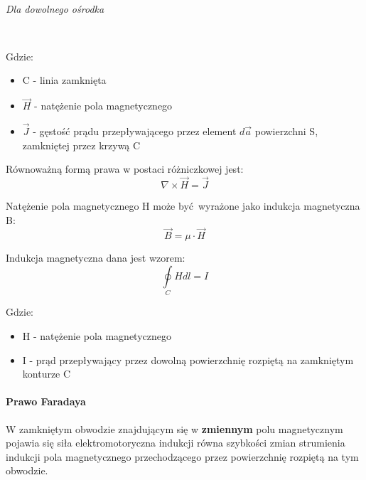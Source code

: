\documentclass{article}
\begin{document}
            \
            
            \textit{Dla dowolnego ośrodka}

            \
            
            Gdzie:
            \begin{itemize}
                \item C - linia zamknięta
                \item $\vec{H}$ - natężenie pola magnetycznego
                \item $\vec{J}$ - gęstość prądu przepływającego przez element
                $d\vec{a}$ powierzchni S, zamkniętej przez krzywą C
            \end{itemize}

            Równoważną formą prawa w postaci różniczkowej jest:
            \begin{equation}
                \nabla \times \vec{H} = \vec{J}
            \end{equation}

            Natężenie pola magnetycznego H może być wyrażone jako indukcja magnetyczna B:
            \begin{equation}
                \vec{B} = \mu \cdotp \vec{H}
            \end{equation}

            Indukcja magnetyczna dana jest wzorem:
            \begin{equation}
                \oint\limits_{C} Hdl = I
            \end{equation}

            Gdzie:
            \begin{itemize}
                \item H - natężenie pola magnetycznego
                \item I - prąd przepływający przez dowolną powierzchnię
                rozpiętą na zamkniętym konturze C
            \end{itemize}

            \paragraph{Prawo Faradaya}
            W zamkniętym obwodzie znajdującym się w \textbf{zmiennym}
            polu magnetycznym pojawia się siła elektromotoryczna
            indukcji równa szybkości zmian strumienia indukcji pola magnetycznego
            przechodzącego przez powierzchnię rozpiętą na tym obwodzie.
\end{document}
